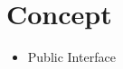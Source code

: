 \section*{\color{NavyBlue}Concept}
\begin{center}
{
\scalebox{1.65}{}
}
\end{center}

\begin{itemize}
\item[] Public Interface
\end{itemize}
